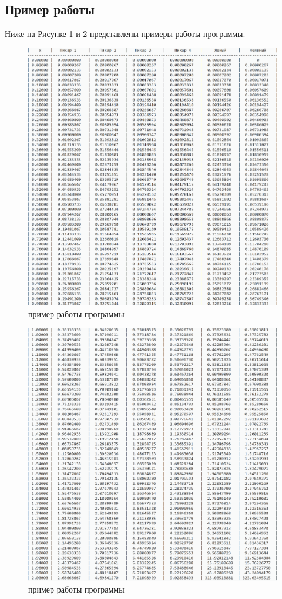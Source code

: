 \documentclass[a4paper, 12pt]{article}
\begin{document}
	\subsection{Пример работы}
	\hspace*{5mm} Ниже на Рисунке 1 и 2 представлены примеры работы программы.
	\begin{figure}[h]
		\centering \includegraphics[scale=0.9]{1}
		\centering\caption{пример работы программы}
	\end{figure}
\clearpage
\newpage
	\begin{figure}[h]
		\centering
		\includegraphics[scale=0.9]{2}
		\centering\caption{пример работы программы}
	\end{figure}
\end{document}
